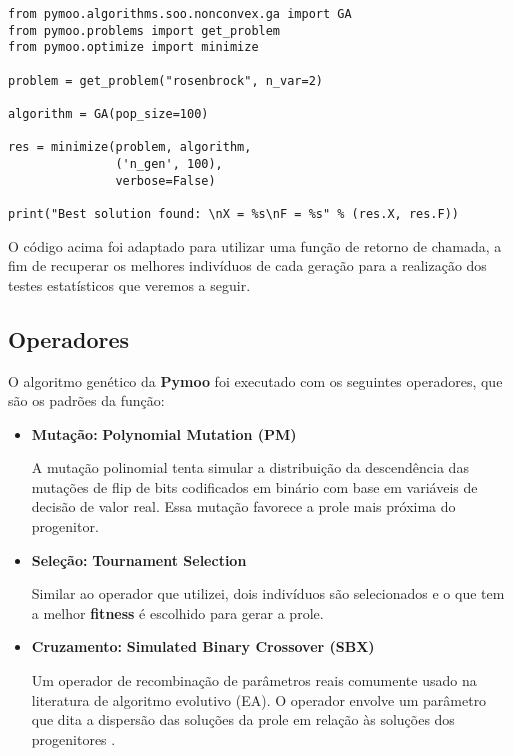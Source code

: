 \documentclass{article}
\begin{document}
\begin{verbatim}
from pymoo.algorithms.soo.nonconvex.ga import GA
from pymoo.problems import get_problem
from pymoo.optimize import minimize

problem = get_problem("rosenbrock", n_var=2)

algorithm = GA(pop_size=100)

res = minimize(problem, algorithm,
               ('n_gen', 100),
               verbose=False)

print("Best solution found: \nX = %s\nF = %s" % (res.X, res.F))

\end{verbatim}

O código acima foi adaptado para utilizar uma função de retorno de chamada, a fim de recuperar os melhores indivíduos de cada geração para a realização dos testes estatísticos que veremos a seguir.

\subsection{Operadores}

O algoritmo genético da \textbf{Pymoo} foi executado com os seguintes operadores, que são os padrões da função:

\begin{itemize}
\item \textbf{Mutação:}
\textbf{Polynomial Mutation (PM)}\cite{pymoo-mutation}

A mutação polinomial tenta simular a distribuição da descendência das mutações de flip de bits codificados em binário com base em variáveis de decisão de valor real. Essa mutação favorece a prole mais próxima do progenitor\cite{r-pm-mutation}. 
    
\item \textbf{Seleção:} \textbf{Tournament Selection}\cite{pymoo-selection}

Similar ao operador que utilizei, dois indivíduos são selecionados e o que tem a melhor \textbf{fitness} é escolhido para gerar a prole.

\item \textbf{Cruzamento:} \textbf{Simulated Binary Crossover (SBX)}\cite{pymoo-crossover}

Um operador de recombinação de parâmetros reais comumente usado na literatura de algoritmo evolutivo (EA). O operador envolve um parâmetro que dita a dispersão das soluções da prole em relação às soluções dos progenitores \cite{deb2007self}. 

\end{itemize}
\end{document}

